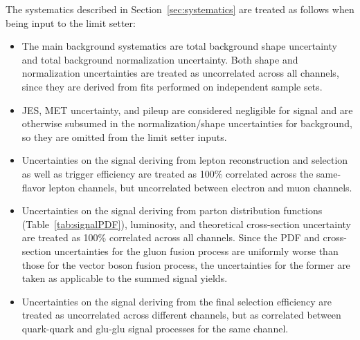 The systematics described in Section~\ref{sec:systematics} are treated
as follows when being input to the limit setter:
\begin{itemize}
\item The main background systematics are total background shape
uncertainty and total background normalization uncertainty. 
Both shape and normalization uncertainties are
treated as uncorrelated across all channels, since they are derived
from fits performed on independent sample sets.
\item JES, MET uncertainty, and pileup are considered negligible for
signal and are otherwise subsumed in the normalization/shape
uncertainties for background, so they are omitted from the limit setter
inputs.
\item Uncertainties on the signal deriving from lepton reconstruction
and selection as well as trigger efficiency are treated as 100\%
correlated across the same-flavor lepton channels, but uncorrelated
between electron and muon channels.
\item Uncertainties on the signal deriving from parton distribution
functions (Table~\ref{tab:signalPDF}), luminosity, and theoretical
cross-section uncertainty are treated as 100\% correlated across all
channels. Since the PDF and cross-section uncertainties for the gluon
fusion process are uniformly worse than those for the vector boson
fusion process, the uncertainties for the former are taken as
applicable to the summed signal yields.
\item Uncertainties on the signal deriving from the final selection
efficiency are treated as uncorrelated across different channels, but as
correlated between quark-quark and glu-glu signal processes for the same
channel.
\end{itemize}

